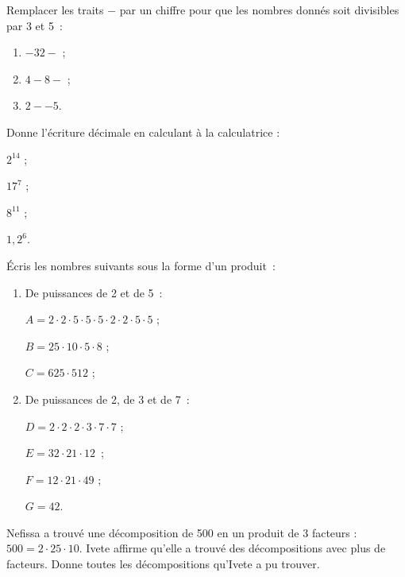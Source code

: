 \begin{exercice}
Remplacer les traits $-$ par un chiffre pour que les nombres donnés soit divisibles par 3 et 5 :
\begin{enumerate}
 \item $- 32 -$ ;
 \item $4 - 8 -$ ;
 \item $2 - - 5$.
 \end{enumerate}
\end{exercice}

\begin{exercice}[Calculatrice]
Donne l'écriture décimale en calculant à la calculatrice :
\begin{colenumerate}{4}
 \item $2^{14}$ ;
 \item $17^7$ ;
 \item $8^{11}$ ;
 \item $1,2^6$.
 \end{colenumerate}
\end{exercice}



\begin{exercice}
Écris les nombres suivants sous la forme d'un produit :
\begin{enumerate}
 \item De puissances de 2 et de 5 :
 
$A = 2 \cdot 2 \cdot 5 \cdot 5 \cdot 5 \cdot 2 \cdot 2 \cdot 5 \cdot 5$ ;

$B = 25 \cdot 10 \cdot 5 \cdot 8$ ;

$C = 625 \cdot 512$ ;
 \item De puissances de 2, de 3 et de 7 :
 
$D = 2 \cdot 2 \cdot 2 \cdot 3 \cdot 7 \cdot 7$ ;

$E = 32 \cdot 21 \cdot 12$ ;

$F = 12 \cdot 21 \cdot 49$ ;

$G = 42$.
 \end{enumerate}
\end{exercice} 

\begin{exercice}
Nefissa a trouvé une décomposition de 500 en un produit de 3 facteurs : $500 = 2 \cdot 25 \cdot 10$. Ivete affirme qu'elle a trouvé des décompositions avec plus de facteurs. Donne toutes les décompositions qu'Ivete a pu trouver.
\end{exercice} 

